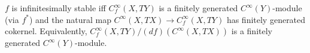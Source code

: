 $f$ is infinitesimally stable iff $C^\infty_f(X, TY)$ is a finitely generated $C^\infty(Y)$-module (via $f^*$) and the natural map $C^\infty(X, TX) \to C^\infty_f(X, TY)$ has finitely generated cokernel. Equivalently, $C^\infty_f(X, TY) / (df)(C^\infty(X, TX))$ is a finitely generated $C^\infty(Y)$-module.
